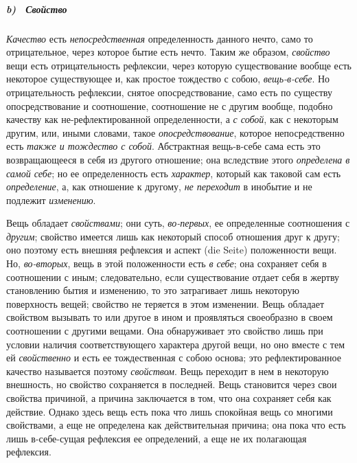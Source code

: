 \subparagraph[b) \ Свойство]{b) \ Свойство}
{\em Качество} есть
{\em непосредственная} определенность данного нечто,
само то отрицательное, через которое бытие есть нечто. Таким же образом,
{\em свойство} вещи есть отрицательность рефлексии,
через которую существование вообще есть некоторое существующее и, как
простое тождество с собою, {\em вещь-в-себе}. Но
отрицательность рефлексии, снятое опосредствование, само есть по существу
опосредствование и соотношение, соотношение не с другим вообще, подобно
качеству как не-рефлектированной определенности, а
{\em с собой}, как с некоторым другим, или, иными
словами, такое {\em опосредствование}, которое
непосредственно есть {\em также и тождество с собой}.
Абстрактная вещь-в-себе сама есть это возвращающееся в себя из другого
отношение; она вследствие этого {\em определена в самой
себе}; но ее определенность есть {\em характер},
который как таковой сам есть {\em определение}, а, как
отношение к другому, {\em не переходит} в инобытие и не
подлежит {\em изменению}.

Вещь обладает {\em свойствами}; они суть,
{\em во-первых}, ее определенные соотношения с
{\em другим}; свойство имеется лишь как некоторый
способ отношения друг к другу; оно поэтому есть внешняя рефлексия и аспект
(die Seite) положенности вещи. Но, {\em во-вторых},
вещь в этой положенности есть {\em в себе}; она
сохраняет себя в соотношении с иным; следовательно, если существование
отдает себя в жертву становлению бытия и изменению, то это затрагивает лишь
некоторую поверхность вещей; свойство не теряется в этом изменении. Вещь
обладает свойством вызывать то или другое в ином и проявляться своеобразно
в своем соотношении с другими вещами. Она обнаруживает это свойство лишь
при условии наличия соответствующего характера другой вещи, но оно вместе с
тем ей {\em свойственно} и есть ее тождественная с
собою основа; это рефлектированное качество называется поэтому
{\em свойством}. Вещь переходит в нем в некоторую
внешность, но свойство сохраняется в последней. Вещь становится через свои
свойства причиной, а причина заключается в том, что она сохраняет себя как
действие. Однако здесь вещь есть пока что лишь спокойная вещь со многими
свойствами, а еще не определена как действительная причина; она пока что
есть лишь в-себе-сущая рефлексия ее определений, а еще не их полагающая
рефлексия.

